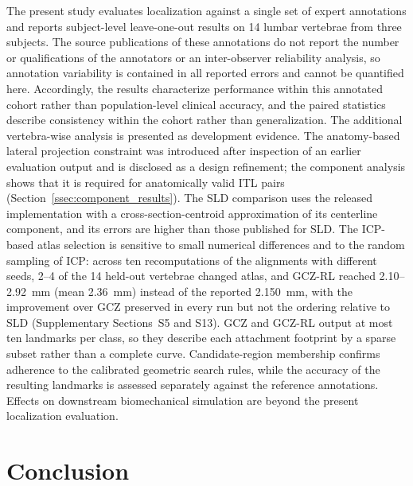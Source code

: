 \documentclass[5p,times,twocolumn,authoryear]{elsarticle}
\newif\ifhighlight
\newcommand{\rev}[1]{\ifhighlight{\color{revcolor}#1}\else#1\fi}
\begin{document}
The present study evaluates localization against a single set of expert annotations and reports subject-level leave-one-out results on 14 lumbar vertebrae from three subjects. \rev{The source publications of these annotations do not report the number or qualifications of the annotators or an inter-observer reliability analysis, so annotation variability is contained in all reported errors and cannot be quantified here.} Accordingly, the results characterize performance within this annotated cohort rather than population-level clinical accuracy, and the paired statistics describe consistency within the cohort rather than generalization. The additional vertebra-wise analysis is presented as development evidence. The anatomy-based lateral projection constraint was introduced after inspection of an earlier evaluation output and is disclosed as a design refinement\rev{; the component analysis shows that it is required for anatomically valid ITL pairs (Section~\ref{ssec:component_results})}. The SLD comparison uses the released implementation with a cross-section-centroid approximation of its centerline component, and its errors are higher than those published for SLD. The ICP-based atlas selection is sensitive to small numerical differences\rev{ and to the random sampling of ICP: across ten recomputations of the alignments with different seeds, 2--4 of the 14 held-out vertebrae changed atlas, and GCZ-RL reached 2.10--2.92~mm (mean 2.36~mm) instead of the reported 2.150~mm, with the improvement over GCZ preserved in every run but not the ordering relative to SLD (Supplementary Sections~S5 and S13)}. GCZ and GCZ-RL output at most ten landmarks per class, so they describe each attachment footprint by a sparse subset rather than a complete curve. Candidate-region membership confirms adherence to the calibrated geometric search rules, while the accuracy of the resulting landmarks is assessed separately against the reference annotations. Effects on downstream biomechanical simulation are beyond the present localization evaluation.

\section{Conclusion}
\label{sec:conclusion}
\end{document}
